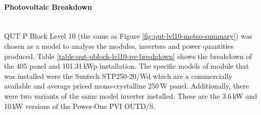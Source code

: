 \paragraph{Photovoltaic Breakdown}
~\\
QUT P Block Level 10 (the same as Figure \ref{fig:qut-lvl10-meteo-summary}) was chosen as a model to analyse the modules, inverters and power quantities produced. Table \ref{table:qut-pblock-lvl10-pv-breakdown} shows the breakdown of the 405 panel and 101.31\,kWp installation. The specific models of module that was installed were the Suntech STP250-20/Wd which are a commercially available and average priced mono-crystalline 250\,W panel. Additionally, there were two variants of the same model inverter installed. These are the 3.6\,kW and 10\,kW versions of the Power-One PVI OUTD/S.        

